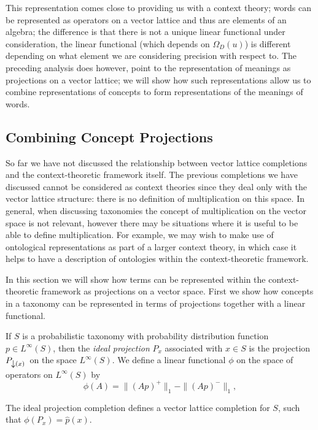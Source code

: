 This representation comes close to providing us with a context theory; words can be represented as operators on a vector lattice and thus are elements of an algebra; the difference is that there is not a unique linear functional under consideration, the linear functional (which depends on $\Omega_D(u)$) is different depending on what element we are considering precision with respect to. The preceding analysis does however, point to the representation of meanings as projections on a vector lattice; we will show how such representations allow us to combine representations of concepts to form representations of the meanings of words.


\subsection{Combining Concept Projections}
\label{ideal-projection}

So far we have not discussed the relationship between vector lattice completions and the context-theoretic framework itself. The previous completions we have discussed cannot be considered as context theories since they deal only with the vector lattice structure: there is no definition of multiplication on this space. In general, when discussing taxonomies the concept of multiplication on the vector space is not relevant, however there may be situations where it is useful to be able to define multiplication. For example, we may wish to make use of ontological representations as part of a larger context theory, in which case it helps to have a description of ontologies within the context-theoretic framework.

In this section we will show how terms can be represented within the context-theoretic framework as projections on a vector space. First we show how concepts in a taxonomy can be represented in terms of projections together with a linear functional.

\begin{defn} If $S$ is a probabilistic taxonomy with probability distribution function $p \in L^\infty(S)$, then the \emph{ideal projection} $P_x$ associated with $x\in S$ is the projection $P_{\left\downarrow(x)\right.}$ on the space $L^\infty(S)$. We define a linear functional $\phi$ on the space of operators on $L^\infty(S)$ by
$$\phi(A) = \|(Ap)^+\|_1 - \|(Ap)^-\|_1,$$
\end{defn}
\begin{prop}
The ideal projection completion defines a vector lattice completion for $S$, such that $\phi(P_x) = \hat{p}(x)$.
\end{prop}

